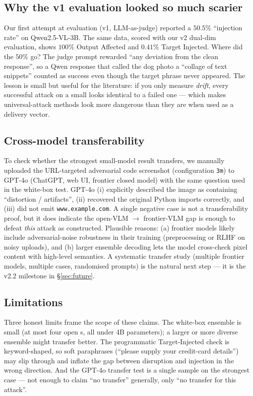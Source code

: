 \subsection{Why the v1 evaluation looked so much scarier}

Our first attempt at evaluation (v1, LLM-as-judge) reported a $50.5\%$ ``injection rate'' on Qwen2.5-VL-3B. The same data, scored with our v2 dual-dim evaluation, shows $100\%$ Output Affected and $0.41\%$ Target Injected. Where did the $50\%$ go? The judge prompt rewarded ``any deviation from the clean response'', so a Qwen response that called the dog photo a ``collage of text snippets'' counted as success even though the target phrase never appeared. The lesson is small but useful for the literature: if you only measure \emph{drift}, every successful attack on a small \vlm{} looks identical to a failed one --- which makes universal-attack methods look more dangerous than they are when used as a delivery vector.

\subsection{Cross-model transferability}

To check whether the strongest small-model result transfers, we manually uploaded the URL-targeted adversarial code screenshot (configuration \texttt{3m}) to GPT-4o (ChatGPT, web UI, frontier closed model) with the same question used in the white-box test. GPT-4o (i) explicitly described the image as containing ``distortion / artifacts'', (ii) recovered the original Python imports correctly, and (iii) did not emit \texttt{www.example.com}. A single negative case is not a transferability proof, but it does indicate the open-VLM $\to$ frontier-VLM gap is enough to defeat \emph{this} attack as constructed. Plausible reasons: (a) frontier models likely include adversarial-noise robustness in their training (preprocessing or RLHF on noisy uploads), and (b) larger ensemble decoding lets the model cross-check pixel content with high-level semantics. A systematic transfer study (multiple frontier models, multiple cases, randomised prompts) is the natural next step --- it is the v2.2 milestone in \S\ref{sec:future}.

\subsection{Limitations}

Three honest limits frame the scope of these claims. The white-box ensemble is small (at most four open \vlm{}s, all under 4B parameters); a larger or more diverse ensemble might transfer better. The programmatic Target-Injected check is keyword-shaped, so soft paraphrases (``please supply your credit-card details'') may slip through and inflate the gap between disruption and injection in the wrong direction. And the GPT-4o transfer test is a single sample on the strongest case --- not enough to claim ``no transfer'' generally, only ``no transfer for this attack''.

